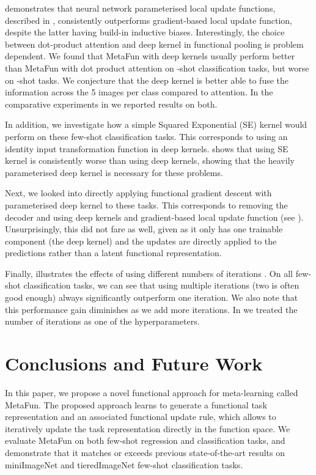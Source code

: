 \documentclass{article}
\theoremstyle{definition}
\begin{document}
 demonstrates that neural network parameterised local update functions, described in , consistently outperforms gradient-based local update function, despite the latter having build-in inductive biases. 
Interestingly, the choice between dot-product attention and deep kernel in functional pooling is problem dependent. We found that MetaFun with deep kernels usually perform better than MetaFun with dot product attention on -shot classification tasks, but worse on -shot tasks. We conjecture that the deep kernel is better able to fuse the information across the 5 images per class compared to attention. In the comparative experiments in  we reported results on both.



In addition, we investigate how a simple Squared Exponential (SE) kernel would perform on these few-shot classification tasks. This corresponds to using an identity input transformation function  in deep kernels.  shows that using SE kernel is consistently worse than using deep kernels, showing that the heavily parameterised deep kernel is necessary for these problems.

Next, we looked into directly applying functional gradient descent with parameterised deep kernel to these tasks. This corresponds to removing the decoder and using deep kernels and gradient-based local update function (see ). Unsurprisingly, this did not fare as well, given as it only has one trainable component (the deep kernel) and the updates are directly applied to the predictions rather than a latent functional representation. 

Finally,  illustrates the effects of using different numbers of iterations . On all few-shot classification tasks, we can see that using multiple iterations (two is often good enough) always significantly outperform one iteration. We also note that this performance gain diminishes as we add more iterations. In  we treated the number of iterations as one of the hyperparameters.

\section{Conclusions and Future Work}

In this paper, we propose a novel functional approach for meta-learning called MetaFun. The proposed approach learns to generate a functional task representation and an associated functional update rule, which allows to iteratively update the task representation directly in the function space.
We evaluate MetaFun on both few-shot regression and classification tasks, and
demonstrate that it matches or exceeds previous state-of-the-art results on miniImageNet and tieredImageNet few-shot classification tasks. 
\end{document}
